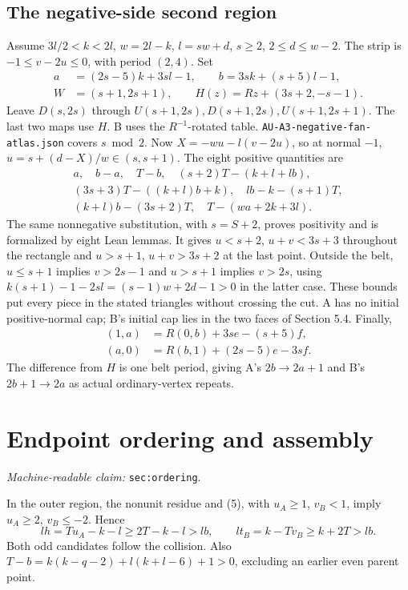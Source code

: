 \documentclass[11pt]{amsart}
\newcommand{\record}[1]{\nolinkurl{#1}}
\newcommand{\claimid}[1]{\par\nopagebreak\noindent\textit{Machine-readable claim:} \record{#1}.\par}
\begin{document}
\subsection{The negative-side second region}
Assume $3l/2<k<2l$, $w=2l-k$, $l=sw+d$, $s\ge2$,
$2\le d\le w-2$. The strip is $-1\le v-2u\le0$, with period
$(2,4)$. Set
\[
\begin{split}
a&=(2s-5)k+3sl-1,\qquad b=3sk+(s+5)l-1,\\
W&=(s+1,2s+1),\qquad H(z)=Rz+(3s+2,-s-1).
\end{split}
\]
Leave $D(s,2s)$ through $U(s+1,2s),D(s+1,2s),U(s+1,2s+1)$.
The last two maps use $H$. B uses the $R^{-1}$-rotated table.
\record{AU-A3-negative-fan-atlas.json} covers $s\bmod2$.
Now $X=-wu-l(v-2u)$, so at normal $-1$,
$u=s+(d-X)/w\in(s,s+1)$. The eight positive quantities are
\begin{equation}\label{eq:10}
\begin{gathered}
a,\quad b-a,\quad T-b,\quad (s+2)T-(k+l+lb),\\
(3s+3)T-((k+l)b+k),\quad lb-k-(s+1)T,\\
(k+l)b-(3s+2)T,\quad T-(wa+2k+3l).
\end{gathered}\tag{10}
\end{equation}
The same nonnegative substitution, with $s=S+2$, proves positivity
and is formalized by eight Lean lemmas. It gives $u<s+2$, $u+v<3s+3$
throughout the rectangle and $u>s+1$, $u+v>3s+2$ at the last point.
Outside the belt, $u\le s+1$ implies $v>2s-1$ and $u>s+1$ implies
$v>2s$, using
$k(s+1)-1-2sl=(s-1)w+2d-1>0$ in the latter case.
These bounds put every piece in the stated triangles without crossing
the cut. A has no initial positive-normal cap; B's initial cap lies
in the two faces of Section 5.4. Finally,
\begin{equation}\label{eq:11}
\begin{aligned}
(1,a)&=R(0,b)+3se-(s+5)f,\\
(a,0)&=R(b,1)+(2s-5)e-3sf.
\end{aligned}\tag{11}
\end{equation}
The difference from $H$ is one belt period, giving A's
$2b\to2a+1$ and B's $2b+1\to2a$ as actual ordinary-vertex repeats.

\section{Endpoint ordering and assembly}\label{sec:ordering}
\claimid{sec:ordering}
In the outer region, the nonunit residue and (5), with
$u_A\ge1$, $v_B<1$, imply $u_A\ge2$, $v_B\le-2$. Hence
\[
 lh=Tu_A-k-l\ge2T-k-l>lb,\qquad
 lt_B=k-Tv_B\ge k+2T>lb.
\]
Both odd candidates follow the collision. Also
$T-b=k(k-q-2)+l(k+l-6)+1>0$, excluding an earlier even parent point.
\end{document}
